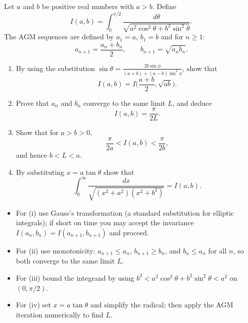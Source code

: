 \begin{problem}
Let $a$ and $b$ be positive real numbers with $a>b$. Define
\[
I(a,b)=\int_{0}^{\pi/2}\frac{d\theta}{\sqrt{a^2\cos^2\theta+b^2\sin^2\theta}}.
\]
The AGM sequences are defined by $a_1=a$, $b_1=b$ and for $n\ge1$:
\[
a_{n+1}=\frac{a_n+b_n}{2},\qquad b_{n+1}=\sqrt{a_nb_n}.
\]
\begin{enumerate}[label=(\roman*)]
\item By using the substitution $\sin \theta = \frac{2b \sin \phi}{(a+b) + (a-b)\sin^2 \phi}$, show that
\[I(a,b)=I\Big(\frac{a+b}{2},\sqrt{ab}\Big).\]
\item Prove that $a_n$ and $b_n$ converge to the same limit $L$, and deduce
\[I(a,b)=\frac{\pi}{2L}.\]
\item Show that for $a>b>0$,
\[\frac{\pi}{2a}<I(a,b)<\frac{\pi}{2b},\]
and hence $b<L<a$.
\item By substituting $x=a\tan\theta$ show that
\[\int_0^{\infty}\frac{dx}{\sqrt{(x^2+a^2)(x^2+b^2)}}=I(a,b).
\]
\end{enumerate}
\end{problem}

\begin{hint}
\begin{itemize}
  \item For (i) use Gauss's transformation (a standard substitution for elliptic integrals); if short on time you may accept the invariance $I(a_n,b_n)=I(a_{n+1},b_{n+1})$ and proceed.
  \item For (ii) use monotonicity: $a_{n+1}\le a_n$, $b_{n+1}\ge b_n$, and $b_n\le a_n$ for all $n$, so both converge to the same limit $L$.
  \item For (iii) bound the integrand by using $b^2< a^2\cos^2\theta+b^2\sin^2\theta< a^2$ on $(0,\pi/2)$.
  \item For (iv) set $x=a\tan\theta$ and simplify the radical; then apply the AGM iteration numerically to find $L$.
\end{itemize}
\end{hint}


